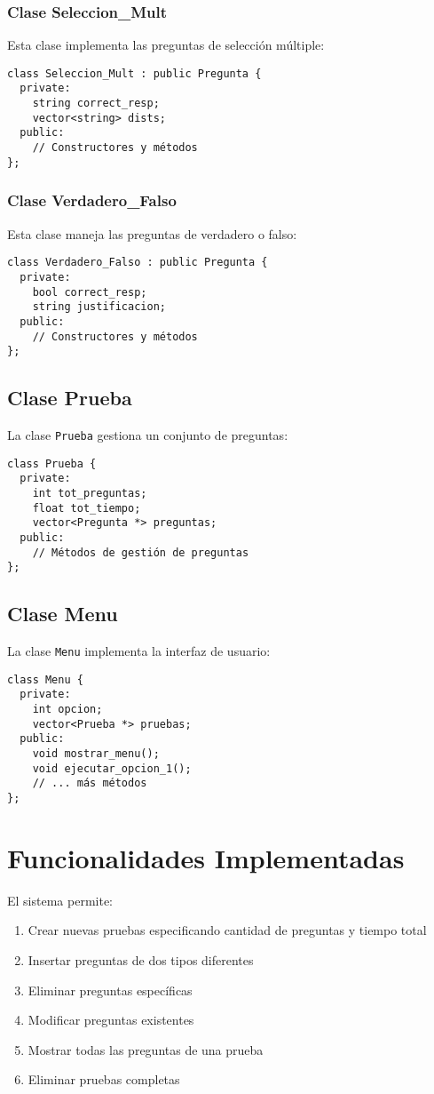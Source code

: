 \documentclass[12pt]{article}
\begin{document}
\subsubsection{Clase Seleccion\_Mult}
Esta clase implementa las preguntas de selección múltiple:

\begin{lstlisting}[style=customc]
class Seleccion_Mult : public Pregunta {  
  private:
    string correct_resp;
    vector<string> dists;
  public:
    // Constructores y métodos
};
\end{lstlisting}

\subsubsection{Clase Verdadero\_Falso}
Esta clase maneja las preguntas de verdadero o falso:

\begin{lstlisting}[style=customc]
class Verdadero_Falso : public Pregunta {
  private:
    bool correct_resp;
    string justificacion;
  public:
    // Constructores y métodos
};
\end{lstlisting}

\subsection{Clase Prueba}
La clase \texttt{Prueba} gestiona un conjunto de preguntas:

\begin{lstlisting}[style=customc]
class Prueba {
  private:
    int tot_preguntas;
    float tot_tiempo;
    vector<Pregunta *> preguntas;
  public:
    // Métodos de gestión de preguntas
};
\end{lstlisting}

\subsection{Clase Menu}
La clase \texttt{Menu} implementa la interfaz de usuario:

\begin{lstlisting}[style=customc]
class Menu {
  private:
    int opcion;
    vector<Prueba *> pruebas;
  public:
    void mostrar_menu();
    void ejecutar_opcion_1();
    // ... más métodos
};
\end{lstlisting}

\section{Funcionalidades Implementadas}
El sistema permite:
\begin{enumerate}
    \item Crear nuevas pruebas especificando cantidad de preguntas y tiempo total
    \item Insertar preguntas de dos tipos diferentes
    \item Eliminar preguntas específicas
    \item Modificar preguntas existentes
    \item Mostrar todas las preguntas de una prueba
    \item Eliminar pruebas completas
\end{enumerate}
\end{document}
